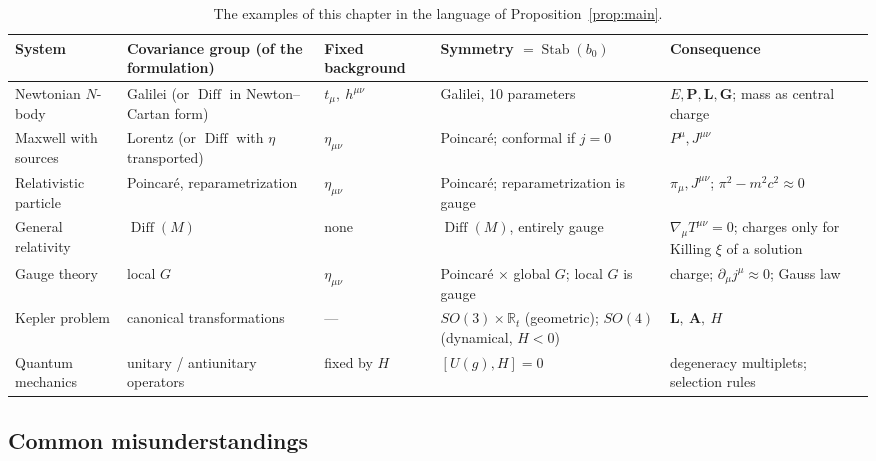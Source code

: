 \documentclass[11pt,a4paper,openany]{book}
\theoremstyle{definition}
\theoremstyle{plain}
\theoremstyle{remark}
\newcommand{\vL}{\bm{L}}
\newcommand{\weakeq}{\approx}
\DeclareMathOperator{\Stab}{Stab}
\DeclareMathOperator{\Diff}{Diff}
\begin{document}
\begin{table}[ht]
\centering
\footnotesize
\renewcommand{\arraystretch}{1.25}
\setlength{\tabcolsep}{3pt}
\begin{tabular}{@{}>{\raggedright\arraybackslash}p{2.2cm}>{\raggedright\arraybackslash}p{3.1cm}>{\raggedright\arraybackslash}p{2.7cm}>{\raggedright\arraybackslash}p{3.5cm}>{\raggedright\arraybackslash}p{3.1cm}@{}}
\toprule
System & Covariance group (of the formulation)
  & Fixed background & Symmetry $=\Stab(b_0)$ & Consequence\\
\midrule
Newtonian $N$-body & Galilei (or $\Diff$ in Newton--Cartan form)
  & $t_\mu,\ h^{\mu\nu}$ & Galilei, 10 parameters
  & $E,\bm P,\bm L,\bm G$; mass as central charge\\
Maxwell with sources & Lorentz (or $\Diff$ with $\eta$ transported)
  & $\eta_{\mu\nu}$ & Poincar\'e; conformal if $j=0$
  & $P^\mu,J^{\mu\nu}$\\
Relativistic particle & Poincar\'e, reparametrization
  & $\eta_{\mu\nu}$ & Poincar\'e; reparametrization is gauge
  & $\pi_\mu,J^{\mu\nu}$; $\pi^2-m^2c^2\weakeq0$\\
General relativity & $\Diff(M)$ & none & $\Diff(M)$, entirely gauge
  & $\nabla_\mu T^{\mu\nu}=0$; charges only for Killing $\xi$ of a solution\\
Gauge theory & local $G$ & $\eta_{\mu\nu}$
  & Poincar\'e $\times$ global $G$; local $G$ is gauge
  & charge; $\partial_\mu j^\mu\weakeq0$; Gauss law\\
Kepler problem & canonical transformations & --- 
  & $SO(3)\times\mathbb R_t$ (geometric); $SO(4)$ (dynamical, $H<0$)
  & $\vL,\ \bm A,\ H$\\
Quantum mechanics & unitary / antiunitary operators & fixed by $H$
  & $[U(g),H]=0$
  & degeneracy multiplets; selection rules\\
\bottomrule
\end{tabular}
\caption{The examples of this chapter in the language of
Proposition~\ref{prop:main}.}
\label{tab:summary}
\end{table}

\subsection{Common misunderstandings}
\end{document}
